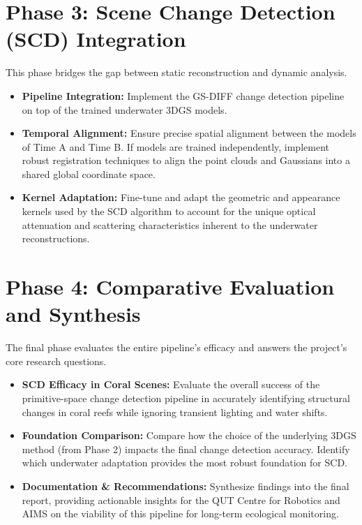 \section{Phase 3: Scene Change Detection (SCD) Integration}
This phase bridges the gap between static reconstruction and dynamic analysis.
\begin{itemize}
    \item \textbf{Pipeline Integration:} Implement the GS-DIFF change detection pipeline on top of the trained underwater 3DGS models.
    \item \textbf{Temporal Alignment:} Ensure precise spatial alignment between the models of Time A and Time B. If models are trained independently, implement robust registration techniques to align the point clouds and Gaussians into a shared global coordinate space.
    \item \textbf{Kernel Adaptation:} Fine-tune and adapt the geometric and appearance kernels used by the SCD algorithm to account for the unique optical attenuation and scattering characteristics inherent to the underwater reconstructions.
\end{itemize}

\section{Phase 4: Comparative Evaluation and Synthesis}
The final phase evaluates the entire pipeline's efficacy and answers the project's core research questions.
\begin{itemize}
    \item \textbf{SCD Efficacy in Coral Scenes:} Evaluate the overall success of the primitive-space change detection pipeline in accurately identifying structural changes in coral reefs while ignoring transient lighting and water shifts.
    \item \textbf{Foundation Comparison:} Compare how the choice of the underlying 3DGS method (from Phase 2) impacts the final change detection accuracy. Identify which underwater adaptation provides the most robust foundation for SCD.
    \item \textbf{Documentation \& Recommendations:} Synthesize findings into the final report, providing actionable insights for the QUT Centre for Robotics and AIMS on the viability of this pipeline for long-term ecological monitoring.
\end{itemize}
